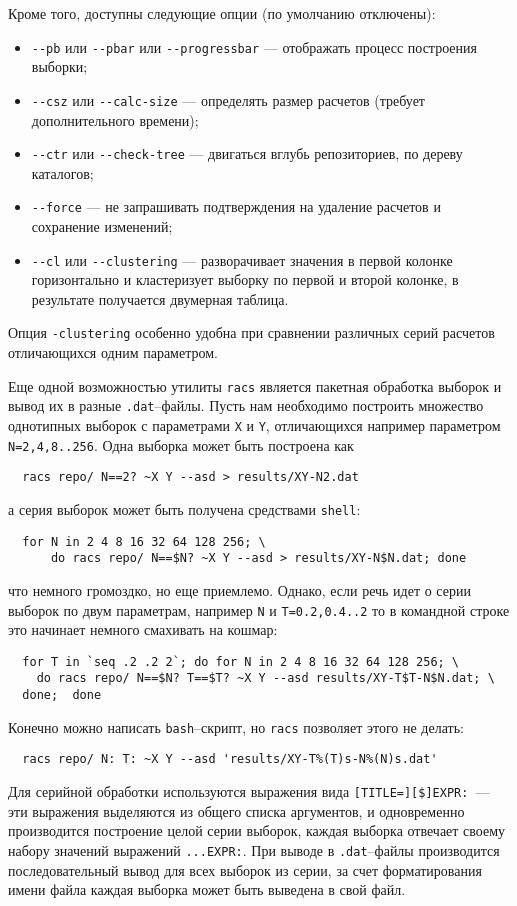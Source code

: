 Кроме того, доступны следующие опции (по умолчанию отключены):
\begin{itemize}
\item \verb'--pb' или \verb'--pbar' или \verb'--progressbar' --- отображать процесс построения выборки;
\item \verb'--csz' или \verb'--calc-size' --- определять размер расчетов (требует дополнительного времени);
\item \verb'--ctr' или \verb'--check-tree' --- двигаться вглубь репозиториев, по дереву каталогов;
\item \verb'--force' --- не запрашивать подтверждения на удаление расчетов и сохранение изменений;
\item \verb'--cl'  или \verb'--clustering' --- разворачивает значения в первой колонке горизонтально
  и кластеризует выборку по первой и второй колонке, в результате получается двумерная таблица.
\end{itemize}
Опция \verb'-clustering' особенно удобна при сравнении различных серий расчетов отличающихся одним параметром. 

Еще одной возможностью утилиты \verb'racs' является пакетная обработка выборок и вывод их в разные \verb'.dat'--файлы.
Пусть нам необходимо построить множество однотипных выборок с параметрами \verb'X' и \verb'Y', отличающихся например параметром \verb'N=2,4,8..256'.
Одна выборка может быть построена как
\begin{verbatim}
  racs repo/ N==2? ~X Y --asd > results/XY-N2.dat
\end{verbatim}
а серия выборок может быть получена средствами  \verb'shell':
\begin{verbatim}
  for N in 2 4 8 16 32 64 128 256; \
      do racs repo/ N==$N? ~X Y --asd > results/XY-N$N.dat; done
\end{verbatim}
что немного громоздко, но еще приемлемо. Однако, если речь идет о серии выборок по двум параметрам, например \verb'N' и \verb'T=0.2,0.4..2' то
в командной строке это начинает немного смахивать на кошмар:
\begin{verbatim}
  for T in `seq .2 .2 2`; do for N in 2 4 8 16 32 64 128 256; \ 
    do racs repo/ N==$N? T==$T? ~X Y --asd results/XY-T$T-N$N.dat; \ 
  done;  done
\end{verbatim}
Конечно можно написать \verb'bash'--скрипт, но \verb'racs' позволяет этого не делать:
\begin{verbatim}
  racs repo/ N: T: ~X Y --asd 'results/XY-T%(T)s-N%(N)s.dat'
\end{verbatim}

Для серийной обработки используются выражения вида \verb'[TITLE=][$]EXPR:'~--- эти выражения выделяются из общего списка аргументов,
и одновременно производится построение целой серии выборок, каждая выборка отвечает своему набору значений выражений \verb'...EXPR:'.
При выводе в \verb'.dat'--файлы производится последовательный вывод для всех выборок из серии, за счет форматирования имени файла
каждая выборка может быть выведена в свой файл.



